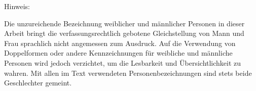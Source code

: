\vspace*{\fill}


\begin{flushleft}
Hinweis:
\end{flushleft}
Die unzureichende Bezeichnung weiblicher und männlicher Personen in dieser Arbeit bringt die verfassungsrechtlich gebotene Gleichstellung von Mann und Frau sprachlich nicht angemessen zum Ausdruck. Auf die Verwendung von Doppelformen oder andere Kennzeichnungen für weibliche und männliche Personen wird jedoch verzichtet, um die Lesbarkeit und Übersichtlichkeit zu wahren. Mit allen im Text verwendeten Personenbezeichnungen sind stets beide Geschlechter gemeint.